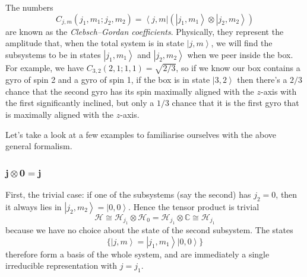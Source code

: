 \documentclass{article}
\theoremstyle{plain}\theoremheaderfont{\normalfont\itshape}\theorembodyfont{\rmfamily}\theoremseparator{.}\newtheorem*{rem}{Remark}\newtheorem*{ex}{Example}\newtheorem*{proof}{Proof}\newtheorem*{altp}{Alternative proof}
\theoremstyle{plain}\theoremheaderfont{\normalfont\bfseries}\theorembodyfont{\rmfamily}\theoremseparator{.}\newtheorem{thm}{Theorem}[section]\newtheorem{lem}[thm]{Lemma}\newtheorem{prop}[thm]{Proposition}\newtheorem*{cor}{Corollary}\newtheorem{defn}[thm]{Definition}\newtheorem{clm}[thm]{Claim}\newtheorem{clminproof}{Claim}
\theoremstyle{break}\theoremheaderfont{\normalfont\itshape}\theorembodyfont{\rmfamily}\theoremseparator{.\medskip}\newtheorem*{proofskip}{Proof}\newtheorem*{exs}{Examples}\newtheorem*{rems}{Remarks}
\theoremstyle{break}\theoremheaderfont{\normalfont\bfseries}\theorembodyfont{\rmfamily}\theoremseparator{.\medskip}\newtheorem{lemskip}[thm]{Lemma}\newtheorem{defnskip}[thm]{Definition}\newtheorem{propskip}[thm]{Proposition}\newtheorem{thmskip}[thm]{Theorem}
\numberwithin{equation}{section}
\newcommand{\bra}[1]{\left\langle #1 \right|}
\newcommand{\ket}[1]{\left| #1 \right\rangle}
\newcommand{\hb}{\mathcal{H}}
\newcommand{\CC}{\mathbb{C}}
\begin{document}
    The numbers
    \begin{equation}
        C_{j,m}(j_1,m_1;j_2,m_2)=\bra{j,m}(\ket{j_1,m_1}\otimes\ket{j_2,m_2})
    \end{equation}
    are known as the \textit{Clebsch--Gordan coefficients}. Physically, they represent the amplitude that, when the total system is in state \(\ket{j,m}\), we will find the subsystems to be in states \(\ket{j_1,m_1}\) and \(\ket{j_2,m_2}\) when we peer inside the box. For example, we have \(C_{3,2}(2,1;1,1)=\sqrt{2/3}\), so if we know our box contains a gyro of spin 2 and a gyro of spin 1, if the box is in state \(\ket{3,2}\) then there's a \(2/3\) chance that the second gyro has its spin maximally aligned with the \(z\)-axis with the first significantly inclined, but only a \(1/3\) chance that it is the first gyro that is maximally aligned with the \(z\)-axis.

    Let's take a look at a few examples to familiarise ourselves with the above general formalism.

    \subsubsection{\texorpdfstring{\(\bm{j\otimes 0=j}\)}{j * 0 = j}}
    First, the trivial case: if one of the subsystems (say the second) has \(j_2=0\), then it always lies in \(\ket{j_2,m_2}=\ket{0,0}\). Hence the tensor product is trivial
    \begin{equation}
        \hb\cong\hb_{j_1}\otimes\hb_0=\hb_{j_1}\otimes\CC\cong\hb_{j_1}
    \end{equation}
    because we have no choice about the state of the second subsystem. The states
    \begin{equation}
        \{\ket{j,m}=\ket{j_1,m_1}\ket{0,0}\}
    \end{equation}
    therefore form a basis of the whole system, and are immediately a single irreducible representation with \(j=j_1\).
\end{document}
